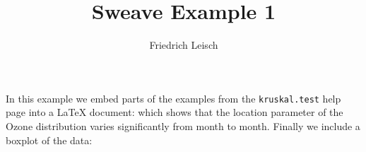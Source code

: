 \documentclass[a4paper]{article}
\title{Sweave Example 1}
\author{Friedrich Leisch}
\begin{document}

\maketitle
In this example we embed parts of the examples from the
\texttt{kruskal.test} help page into a \LaTeX{} document:
which shows that the location parameter of the Ozone 
distribution varies significantly from month to month. Finally we
include a boxplot of the data:
\begin{center}

\end{center}
\end{document}

